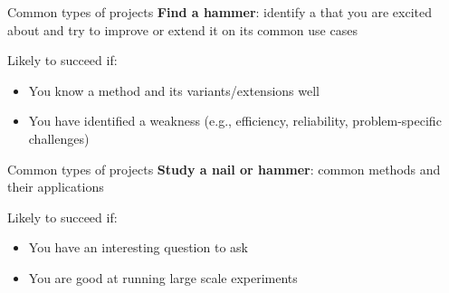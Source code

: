 \documentclass[usenames,dvipsnames,notes,11pt,aspectratio=169,hyperref={colorlinks=true, linkcolor=blue}]{beamer}
\begin{document}
\begin{frame}
    {Common types of projects}
    \textbf{Find a hammer}: identify a  that you are excited about and try to improve or extend it on its common use cases 


    Likely to succeed if:\\
    \begin{itemize}
        \item You know a method and its variants/extensions well 
        \item You have identified a weakness (e.g., efficiency, reliability, problem-specific challenges) 
    \end{itemize}
\end{frame}

\begin{frame}
    {Common types of projects}
    \textbf{Study a nail or hammer}:  common methods and their applications 


    Likely to succeed if:\\
    \begin{itemize}
        \item You have an interesting question to ask 
        \item You are good at running large scale experiments 
    \end{itemize}
\end{frame}
\end{document}
